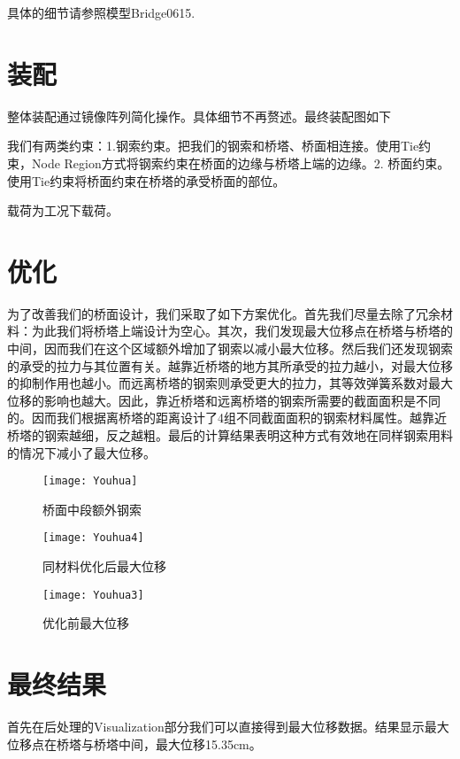 \documentclass[UTF8]{ctexart}
\begin{document}
具体的细节请参照模型Bridge0615.

\section{装配}

整体装配通过镜像阵列简化操作。具体细节不再赘述。最终装配图如下

我们有两类约束：1.钢索约束。把我们的钢索和桥塔、桥面相连接。使用Tie约束，Node Region方式将钢索约束在桥面的边缘与桥塔上端的边缘。2. 桥面约束。使用Tie约束将桥面约束在桥塔的承受桥面的部位。

载荷为工况下载荷。



\section{优化}
为了改善我们的桥面设计，我们采取了如下方案优化。首先我们尽量去除了冗余材料：为此我们将桥塔上端设计为空心。其次，我们发现最大位移点在桥塔与桥塔的中间，因而我们在这个区域额外增加了钢索以减小最大位移。然后我们还发现钢索的承受的拉力与其位置有关。越靠近桥塔的地方其所承受的拉力越小，对最大位移的抑制作用也越小。而远离桥塔的钢索则承受更大的拉力，其等效弹簧系数对最大位移的影响也越大。因此，靠近桥塔和远离桥塔的钢索所需要的截面面积是不同的。因而我们根据离桥塔的距离设计了4组不同截面面积的钢索材料属性。越靠近桥塔的钢索越细，反之越粗。最后的计算结果表明这种方式有效地在同样钢索用料的情况下减小了最大位移。

\begin{figure}[h]%
	\centering  %
	\texttt{[image: Youhua]}  %
	\caption{桥面中段额外钢索}  %
\end{figure}

\begin{figure}[h]
	\begin{minipage}[t]{0.5\linewidth}
		\centering
		\texttt{[image: Youhua4]}
		\caption{同材料优化后最大位移}
	\end{minipage}%
	\hfill
	\begin{minipage}[t]{0.5\linewidth}
		\centering
		\texttt{[image: Youhua3]}
		\caption{优化前最大位移}
	\end{minipage}
\end{figure}

\section{最终结果}
首先在后处理的Visualization部分我们可以直接得到最大位移数据。结果显示最大位移点在桥塔与桥塔中间，最大位移15.35cm。
\end{document}
